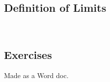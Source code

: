 {}
\subsection{Definition of Limits}
\noindent{}
\newpage

~\vfill
\newpage
\subsection{Exercises}
Made as a Word doc.
~\vfill


{}

